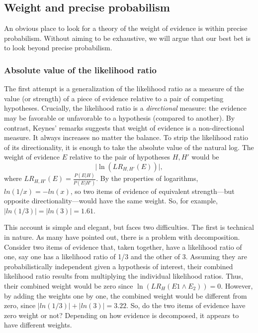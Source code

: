 \documentclass[
  10pt,
  dvipsnames,enabledeprecatedfontcommands]{scrartcl}
\begin{document}
\hypertarget{weight-and-precise-probabilism}{%
\subsection{Weight and precise
probabilism}\label{weight-and-precise-probabilism}}

An obvious place to look for a theory of the weight of evidence is
within precise probabilism. Without aiming to be exhaustive, we will
argue that our best bet is to look beyond precise probabilism.

\hypertarget{absolute-value-of-the-likelihood-ratio}{%
\subsubsection{Absolute value of the likelihood
ratio}\label{absolute-value-of-the-likelihood-ratio}}

The first attempt is a generalization of the likelihood ratio as a
measure of the value (or strength) of a piece of evidence relative to a
pair of competing hypotheses. Crucially, the likelihood ratio is a
\emph{directional} measure: the evidence may be favorable or unfavorable
to a hypothesis (compared to another). By contrast, Keynes' remarks
suggests that weight of evidence is a non-directional measure. It always
increases no matter the balance. To strip the likelihood ratio of its
directionality, it is enough to take the absolute value of the natural
log.
The weight of evidence \(E\) relative to the pair of hypotheses
\(H, H'\) would be \[\vert \ln (LR_{H, H'}(E)) \vert, \] where
\(LR_{H, H'}(E)=\frac{P(E \vert H)}{P(E \vert H')}\). By the properties
of logarithms, \(ln(1/x) = -ln(x)\), so two items of evidence of
equivalent strength---but opposite directionality---would have the same
weight. So, for example, \(|ln(1/3)|= |ln(3)| = 1.61\).

This account is simple and elegant, but faces two difficulties. The
first is technical in nature. As many have pointed out, there is a
problem with decomposition. Consider two items of evidence that, taken
together, have a likelihood ratio of one, say one has a likelihood ratio
of 1/3 and the other of 3. Assuming they are probabilistically
independent given a hypothesis of interest, their combined likelihood
ratio results from multiplying the individual likelihood ratios. Thus,
their combined weight would be zero since
\(\ln (LR_H(E1 \wedge E_2))=0\). However, by adding the weights one by
one, the combined weight would be different from zero, since
\(|ln(1/3)| + |ln(3)| = 3.22\). So, do the two items of evidence have
zero weight or not? Depending on how evidence is decomposed, it appears
to have different weights.
\end{document}
